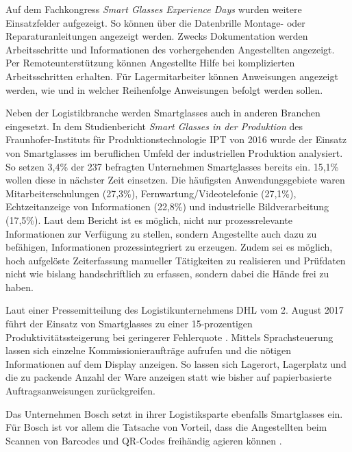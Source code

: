 Auf dem Fachkongress \emph{Smart Glasses Experience Days} \cite{Manokaran-Pathamathan2017} wurden weitere Einsatzfelder aufgezeigt. So können über die Datenbrille Montage- oder Reparaturanleitungen angezeigt werden. Zwecks Dokumentation werden Arbeitsschritte und Informationen des vorhergehenden Angestellten angezeigt. Per Remoteunterstützung können Angestellte Hilfe bei komplizierten Arbeitsschritten erhalten. Für Lagermitarbeiter können Anweisungen angezeigt werden, wie und in welcher Reihenfolge Anweisungen befolgt werden sollen.

Neben der Logistikbranche werden Smartglasses auch in anderen Branchen eingesetzt. In dem Studienbericht \emph{Smart Glasses in der Produktion} des Fraunhofer-Instituts für Produktionstechnologie IPT von 2016 \cite{Plutz} wurde der Einsatz von Smartglasses im beruflichen Umfeld der industriellen Produktion analysiert. So setzen 3,4\% der 237 befragten Unternehmen  Smartglasses bereits ein. 15,1\% wollen diese in nächster Zeit einsetzen. Die häufigsten Anwendungsgebiete waren Mitarbeiterschulungen (27,3\%), Fernwartung/Videotelefonie (27,1\%), Echtzeitanzeige von Informationen (22,8\%) und industrielle Bildverarbeitung (17,5\%). Laut dem Bericht ist es möglich, nicht nur prozessrelevante Informationen zur Verfügung zu stellen, sondern Angestellte auch dazu zu befähigen, Informationen prozessintegriert zu erzeugen. Zudem sei es möglich, hoch aufgelöste Zeiterfassung manueller Tätigkeiten zu realisieren und Prüfdaten nicht wie bislang handschriftlich zu erfassen, sondern dabei die Hände frei zu haben.

Laut einer Pressemitteilung des Logistikunternehmens DHL vom 2. August 2017 führt der Einsatz von Smartglasses zu einer 15-prozentigen Produktivitätssteigerung bei geringerer Fehlerquote \cite{DeutschePostDHLGroup2017}. Mittels Sprachsteuerung lassen sich einzelne Kommissionieraufträge aufrufen und die nötigen Informationen auf dem Display anzeigen. So lassen sich Lagerort, Lagerplatz und die zu packende Anzahl der Ware anzeigen statt wie bisher auf papierbasierte Auftragsanweisungen zurückgreifen. 

Das Unternehmen Bosch setzt in ihrer Logistiksparte ebenfalls Smartglasses ein. Für Bosch ist vor allem die Tatsache von Vorteil, dass die Angestellten beim Scannen von Barcodes und QR-Codes freihändig agieren können \cite{Spinger2014}. 